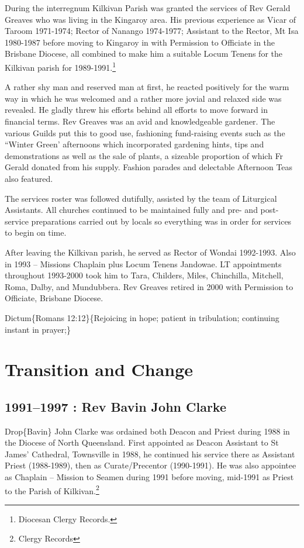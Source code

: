 During the interregnum Kilkivan Parish was granted the services of Rev Gerald Greaves who was living in the Kingaroy area. His previous experience as Vicar of Taroom 1971-1974; Rector of Nanango 1974-1977; Assistant to the Rector, Mt Isa 1980-1987 before moving to Kingaroy in with Permission to Officiate in the Brisbane Diocese, all combined to make him a suitable Locum Tenens for the Kilkivan parish for 1989-1991.\footnote{Diocesan Clergy Records.}

A rather shy man and reserved man at first, he reacted positively for the warm way in which he was welcomed and a rather more jovial and relaxed side was revealed. He gladly threw his efforts behind all efforts to move forward in financial terms. Rev Greaves was an avid and knowledgeable gardener. The various Guilds put this to good use, fashioning fund-raising events such as the ``Winter Green' afternoons which incorporated gardening hints, tips and demonstrations as well as the sale of plants, a sizeable proportion of which Fr Gerald donated from his supply. Fashion parades and delectable Afternoon Teas also featured.

The services roster was followed dutifully, assisted by the team of Liturgical Assistants. All churches continued to be maintained fully and pre- and post-service preparations carried out by locals so everything was in order for services to begin on time.

After leaving the Kilkivan parish, he served as Rector of Wondai 1992-1993. Also in 1993 -- Missions Chaplain plus Locum Tenens Jandowae. LT appointments throughout 1993-2000 took him to Tara, Childers, Miles, Chinchilla, Mitchell, Roma, Dalby, and Mundubbera. Rev Greaves retired in 2000 with Permission to Officiate, Brisbane Diocese.

Dictum\{Romans 12:12\}\{Rejoicing in hope; patient in tribulation; continuing instant in prayer;\}

\hypertarget{transition-and-change}{%
\chapter{Transition and Change}\label{transition-and-change}}

\hypertarget{rev-bavin-john-clarke}{%
\section{1991--1997 : Rev Bavin John Clarke}\label{rev-bavin-john-clarke}}

Drop\{Bavin\} John Clarke was ordained both Deacon and Priest during 1988 in the Diocese of North Queensland. First appointed as Deacon Assistant to St James' Cathedral, Townsville in 1988, he continued his service there as Assistant Priest (1988-1989), then as Curate/Precentor (1990-1991). He was also appointee as Chaplain -- Mission to Seamen during 1991 before moving, mid-1991 as Priest to the Parish of Kilkivan.\footnote{Clergy Records}

